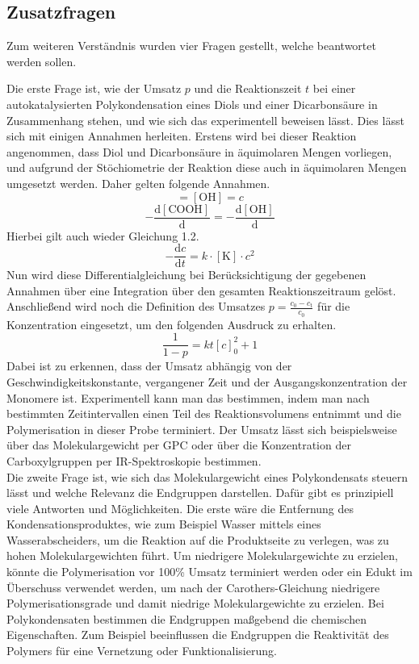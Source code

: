 \documentclass[12pt, bibliography=totocnumbered]{scrartcl}
\begin{document}
\subsection{Zusatzfragen}
Zum weiteren Verständnis wurden vier Fragen gestellt, welche beantwortet werden sollen.\par
Die erste Frage ist, wie der Umsatz $p$ und die Reaktionszeit $t$ bei einer autokatalysierten Polykondensation eines Diols und einer Dicarbonsäure in Zusammenhang stehen, und wie sich das experimentell beweisen lässt. Dies lässt sich mit einigen Annahmen herleiten. Erstens wird bei dieser Reaktion angenommen, dass Diol und Dicarbonsäure in äquimolaren Mengen vorliegen, und aufgrund der Stöchiometrie der Reaktion diese auch in äquimolaren Mengen umgesetzt werden. Daher gelten folgende Annahmen.
\begin{equation}
[\mathrm{COOH}]=[\mathrm{OH}]=c    
\nonumber
\end{equation}
\begin{equation}
   -\frac{\mathrm{d}[\mathrm{COOH}]}{\mathrm{d}}= 
   -\frac{\mathrm{d}[\mathrm{OH}]}{\mathrm{d}} 
   \nonumber
\end{equation}
Hierbei gilt auch wieder Gleichung 1.2.
\begin{equation}
-\frac{\mathrm{d}c}{\mathrm{d}t}=k\cdot\mathrm{[K]}\cdot c^2  
\nonumber
\end{equation}
Nun wird diese Differentialgleichung bei Berücksichtigung der gegebenen Annahmen über eine Integration über den gesamten Reaktionszeitraum gelöst. Anschließend wird noch die Definition des Umsatzes $p=\frac{c_\mathrm{0}-c_\mathrm{t}}{c_\mathrm{0}}$ für die Konzentration eingesetzt, um den folgenden Ausdruck zu erhalten.
\begin{equation}
\frac{1}{1-p}=kt [c]_0^2 +1
\nonumber
\end{equation}
Dabei ist zu erkennen, dass der Umsatz abhängig von der Geschwindigkeitskonstante, vergangener Zeit und der Ausgangskonzentration der Monomere ist. Experimentell kann man das bestimmen, indem man nach bestimmten Zeitintervallen einen Teil des Reaktionsvolumens entnimmt und die Polymerisation in dieser Probe terminiert. Der Umsatz lässt sich beispielsweise über das Molekulargewicht per GPC oder über die Konzentration der Carboxylgruppen per IR-Spektroskopie bestimmen.\\
Die zweite Frage ist, wie sich das Molekulargewicht eines Polykondensats steuern lässt und welche Relevanz die Endgruppen darstellen. Dafür gibt es prinzipiell viele Antworten und Möglichkeiten. Die erste wäre die Entfernung des Kondensationsproduktes, wie zum Beispiel Wasser mittels eines Wasserabscheiders, um die Reaktion auf die Produktseite zu verlegen, was zu hohen Molekulargewichten führt. Um niedrigere Molekulargewichte zu erzielen, könnte die Polymerisation vor 100\% Umsatz terminiert werden oder ein Edukt im Überschuss verwendet werden, um nach der Carothers-Gleichung niedrigere Polymerisationsgrade und damit niedrige Molekulargewichte zu erzielen. Bei Polykondensaten bestimmen die Endgruppen maßgebend die chemischen Eigenschaften. Zum Beispiel beeinflussen die Endgruppen die Reaktivität des Polymers für eine Vernetzung oder Funktionalisierung.\\
\end{document}
